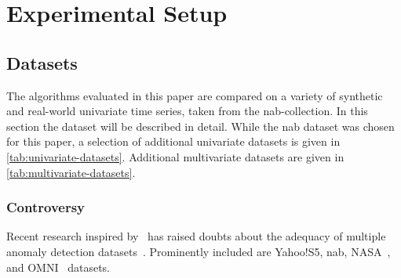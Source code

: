 \section{Experimental Setup}\label{sect:experimental-setup}

\subsection{Datasets}\label{subsect:datasets}
The algorithms evaluated in this paper are compared on a variety of synthetic
and real-world univariate time series, taken from the \gls{nab}-collection.
In this section the dataset will be described in detail. While the \gls{nab}
dataset was chosen for this paper, a selection of additional univariate datasets
is given in \cref{tab:univariate-datasets}. Additional multivariate datasets are
given in \cref{tab:multivariate-datasets}.

\subsubsection{Controversy}
Recent research inspired by~\cite{Nakamura.2020} has raised doubts about the
adequacy of multiple anomaly detection datasets~\cite{Renjie.2020}. Prominently
included are Yahoo!S5, \gls{nab}, NASA~\cite{Hundman.2018}, and OMNI~\cite{Su.2019}
datasets.


